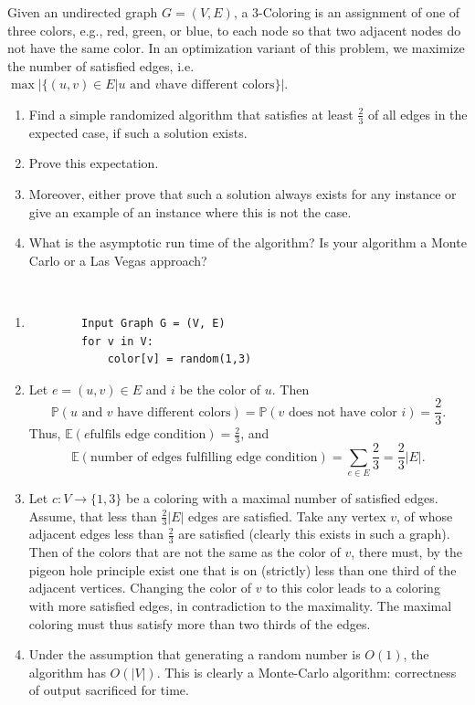 \documentclass{article}
\begin{document}
\begin{exercise}
    Given an undirected graph $G= (V,E)$, a $3$-Coloring is an assignment of one of three colors, e.g., red, green, or blue, to each node so that two adjacent nodes do not have the same color. In an optimization variant of this problem, we maximize the number of satisfied edges, i.e. $\max|\{(u,v)\in E| u \text{ and } v \text{have different colors}\}|$.\begin{enumerate}
        \item  Find a simple randomized algorithm that satisfies at least $\frac23$ of all edges in the expected case, if such a solution exists.
        \item Prove this expectation.
        \item Moreover, either prove that such a solution always exists for any instance or give an example of an instance where this is not the case.
        \item What is the asymptotic run time of the algorithm? Is your algorithm a Monte Carlo or a Las Vegas approach?
    \end{enumerate} 
\end{exercise}
\begin{solving}~
\begin{enumerate}
    \item \begin{verbatim}
        Input Graph G = (V, E)
        for v in V:
            color[v] = random(1,3)
    \end{verbatim}
    \item Let $e= (u,v)\in E$ and $i$ be the color of $u$. Then $$\mathbb P(u\text{ and } v \text{ have different colors}) = \mathbb P(v\text{ does not have color }i) = \frac23.$$ Thus, $\mathbb E(e \text{fulfils edge condition}) = \frac 23$, and $$\mathbb E(\text{number of edges fulfilling edge condition}) = \sum_{e\in E}\frac 23 = \frac23|E|.$$
    \item Let $c: V\to \{1,3\}$ be a coloring with a maximal number of satisfied edges. Assume, that less than $\frac23|E|$ edges are satisfied. Take any vertex $v$, of whose adjacent edges less than $\frac23$ are satisfied (clearly this exists in such a graph). Then of the colors that are not the same as the color of $v$, there must, by the pigeon hole principle exist one that is on (strictly) less than one third of the adjacent vertices. Changing the color of $v$ to this color leads to a coloring with more satisfied edges, in contradiction to the maximality. The maximal coloring must thus satisfy more than two thirds of the edges.
    \item Under the assumption that generating a random number is $O(1)$, the algorithm has $O(|V|)$. This is clearly a Monte-Carlo algorithm: correctness of output sacrificed for time.
\end{enumerate}
\end{solving}
\newpage
\end{document}
